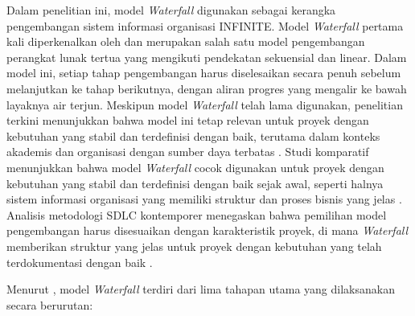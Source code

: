 Dalam penelitian ini, model \textit{Waterfall} digunakan sebagai kerangka pengembangan sistem informasi organisasi INFINITE. Model \textit{Waterfall} pertama kali diperkenalkan oleh \citet{Royce_1970_Waterfall} dan merupakan salah satu model pengembangan perangkat lunak tertua yang mengikuti pendekatan sekuensial dan linear. Dalam model ini, setiap tahap pengembangan harus diselesaikan secara penuh sebelum melanjutkan ke tahap berikutnya, dengan aliran progres yang mengalir ke bawah layaknya air terjun. Meskipun model \textit{Waterfall} telah lama digunakan, penelitian terkini menunjukkan bahwa model ini tetap relevan untuk proyek dengan kebutuhan yang stabil dan terdefinisi dengan baik, terutama dalam konteks akademis dan organisasi dengan sumber daya terbatas \citep{Saravanos_2023_Waterfall}. Studi komparatif menunjukkan bahwa model \textit{Waterfall} cocok digunakan untuk proyek dengan kebutuhan yang stabil dan terdefinisi dengan baik sejak awal, seperti halnya sistem informasi organisasi yang memiliki struktur dan proses bisnis yang jelas \citep{Balaji_2012_Waterfall, Akinsola_2020_SDLC}. Analisis metodologi SDLC kontemporer menegaskan bahwa pemilihan model pengembangan harus disesuaikan dengan karakteristik proyek, di mana \textit{Waterfall} memberikan struktur yang jelas untuk proyek dengan kebutuhan yang telah terdokumentasi dengan baik \citep{Vallon_2018_AgilePracticesGSD, Jabangwe_2018_MobileProcessModelsSLR}.

Menurut \citet{Sommerville_2016_SE}, model \textit{Waterfall} terdiri dari lima tahapan utama yang dilaksanakan secara berurutan:


